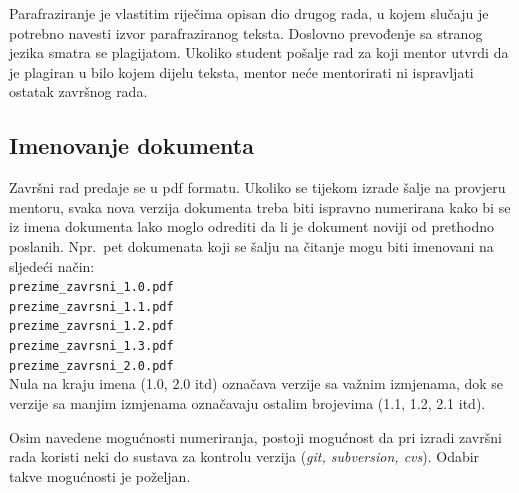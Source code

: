 Parafraziranje je vlastitim riječima opisan dio drugog rada, u kojem slučaju je potrebno navesti izvor 
parafraziranog teksta. Doslovno prevođenje sa stranog jezika smatra se plagijatom. Ukoliko student pošalje rad za koji mentor utvrdi da je plagiran u bilo kojem dijelu teksta, mentor neće mentorirati ni ispravljati ostatak završnog rada.

\subsection{Imenovanje dokumenta}
Završni rad predaje se u pdf formatu. Ukoliko se tijekom izrade šalje na provjeru mentoru, svaka nova verzija dokumenta treba biti 
ispravno numerirana kako bi se iz imena 
dokumenta lako moglo odrediti da li je dokument noviji od prethodno poslanih. Npr.~pet dokumenata koji se šalju na čitanje mogu biti 
imenovani na sljedeći način:
\\
\texttt{prezime\_zavrsni\_1.0.pdf}\\
\texttt{prezime\_zavrsni\_1.1.pdf}\\
\texttt{prezime\_zavrsni\_1.2.pdf}\\
\texttt{prezime\_zavrsni\_1.3.pdf}\\
\texttt{prezime\_zavrsni\_2.0.pdf}\\
Nula na kraju imena (1.0, 2.0 itd) označava verzije sa važnim izmjenama, dok se verzije sa manjim izmjenama označavaju ostalim brojevima (1.1, 1.2, 2.1 itd). 

Osim navedene mogućnosti numeriranja, postoji mogućnost da pri izradi završni rada koristi neki do sustava za kontrolu verzija (\textit{git, subversion, cvs}). Odabir takve mogućnosti je poželjan.

